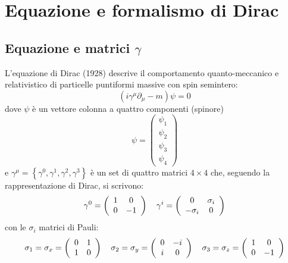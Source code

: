 \documentclass{subnucbo}
\begin{document}
\appendix
\section{Equazione e formalismo di Dirac}
\label{app:dirac}
\subsection{Equazione e matrici $\gamma$}
L'equazione di Dirac (1928) descrive il comportamento quanto-meccanico e relativistico di particelle puntiformi massive con spin semintero:
\begin{equation}
        \left( i \gamma ^ { \mu } \partial _ { \mu } - m \right) \psi = 0
        \label{eq:dirac_equation}
\end{equation}
dove $\psi$ è un vettore colonna a quattro componenti (spinore)
\begin{equation}
        \psi = \left( \begin{array} { c } { \psi _ { 1 } } \\ { \psi _ { 2 } } \\ { \psi _ { 3 } } \\ { \psi _ { 4 } } \end{array} \right)
        \label{eq:spinor}
\end{equation}
e $\gamma^{\mu} = \left\{ \gamma ^ { 0 } , \gamma ^ { 1 } , \gamma ^ { 2 } , \gamma ^ { 3 } \right\}$ è un set di quattro matrici $4\times 4$ che, seguendo la rappresentazione di Dirac, si scrivono:
\begin{equation}
        \gamma ^ { 0 } = \left( \begin{array} { c c } { 1 } & { 0 } \\ { 0 } & { - 1 } \end{array} \right) \quad \gamma ^ { i } = \left( \begin{array} { c c } { 0 } & { \sigma _ { i } } \\ { - \sigma _ { i } } & { 0 } \end{array} \right)
        \label{eq:gamma_components}
\end{equation}
con le $\sigma_{i}$ matrici di Pauli:
\begin{equation}
        \sigma_{1} = \sigma _ { x } = \left( \begin{array} { c c } { 0 } & { 1 } \\ { 1 } & { 0 } \end{array} \right) \quad \sigma_{2} = \sigma _ { y } = \left( \begin{array} { c c } { 0 } & { - i } \\ { i } & { 0 } \end{array} \right) \quad \sigma_{3} = \sigma _ { z } = \left( \begin{array} { c c } { 1 } & { 0 } \\ { 0 } & { - 1 } \end{array} \right)
        \label{eq:pauli_matrices}
\end{equation}
\end{document}
